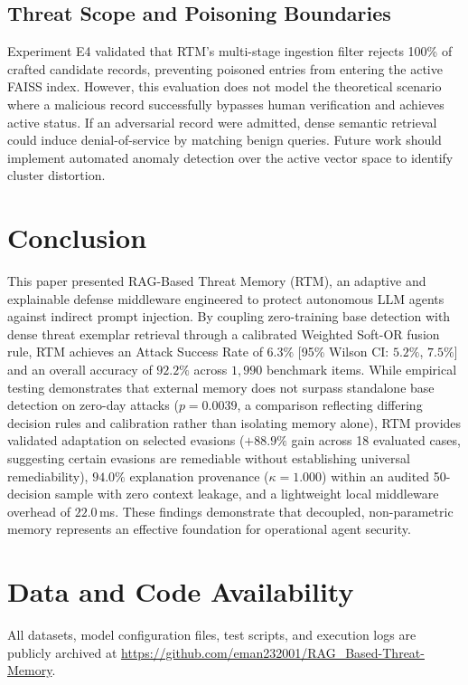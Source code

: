 \documentclass[conference]{IEEEtran}
\begin{document}
\subsection{Threat Scope and Poisoning Boundaries}
Experiment E4 validated that RTM's multi-stage ingestion filter rejects 100\% of crafted candidate records, preventing poisoned entries from entering the active FAISS index. However, this evaluation does not model the theoretical scenario where a malicious record successfully bypasses human verification and achieves active status. If an adversarial record were admitted, dense semantic retrieval could induce denial-of-service by matching benign queries. Future work should implement automated anomaly detection over the active vector space to identify cluster distortion.

\section{Conclusion}
This paper presented RAG-Based Threat Memory (RTM), an adaptive and explainable defense middleware engineered to protect autonomous LLM agents against indirect prompt injection. By coupling zero-training base detection with dense threat exemplar retrieval through a calibrated Weighted Soft-OR fusion rule, RTM achieves an Attack Success Rate of $6.3\%$ [95\% Wilson CI: $5.2\%$, $7.5\%$] and an overall accuracy of $92.2\%$ across $1,990$ benchmark items. While empirical testing demonstrates that external memory does not surpass standalone base detection on zero-day attacks ($p = 0.0039$, a comparison reflecting differing decision rules and calibration rather than isolating memory alone), RTM provides validated adaptation on selected evasions ($+88.9\%$ gain across 18 evaluated cases, suggesting certain evasions are remediable without establishing universal remediability), $94.0\%$ explanation provenance ($\kappa = 1.000$) within an audited 50-decision sample with zero context leakage, and a lightweight local middleware overhead of $22.0$\,ms. These findings demonstrate that decoupled, non-parametric memory represents an effective foundation for operational agent security.

\section*{Data and Code Availability}
All datasets, model configuration files, test scripts, and execution logs are publicly archived at \url{https://github.com/eman232001/RAG_Based-Threat-Memory}.
\end{document}
